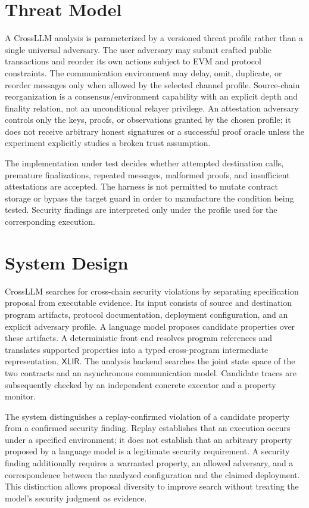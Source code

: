 \documentclass[journal]{IEEEtran}
\theoremstyle{definition}
\newcommand{\xlir}{\ensuremath{\mathsf{XLIR}}}
\begin{document}
\section{Threat Model}
\label{sec:threat}

A CrossLLM analysis is parameterized by a versioned threat profile rather than a single universal adversary. The user adversary may submit crafted public transactions and reorder its own actions subject to EVM and protocol constraints. The communication environment may delay, omit, duplicate, or reorder messages only when allowed by the selected channel profile. Source-chain reorganization is a consensus/environment capability with an explicit depth and finality relation, not an unconditional relayer privilege. An attestation adversary controls only the keys, proofs, or observations granted by the chosen profile; it does not receive arbitrary honest signatures or a successful proof oracle unless the experiment explicitly studies a broken trust assumption.

The implementation under test decides whether attempted destination calls, premature finalizations, repeated messages, malformed proofs, and insufficient attestations are accepted. The harness is not permitted to mutate contract storage or bypass the target guard in order to manufacture the condition being tested. Security findings are interpreted only under the profile used for the corresponding execution.

\section{System Design}
\label{sec:design-v2}

CrossLLM searches for cross-chain security violations by separating specification proposal from executable evidence. Its input consists of source and destination program artifacts, protocol documentation, deployment configuration, and an explicit adversary profile. A language model proposes candidate properties over these artifacts. A deterministic front end resolves program references and translates supported properties into a typed cross-program intermediate representation, $\xlir$. The analysis backend searches the joint state space of the two contracts and an asynchronous communication model. Candidate traces are subsequently checked by an independent concrete executor and a property monitor.

The system distinguishes a replay-confirmed violation of a candidate property from a confirmed security finding. Replay establishes that an execution occurs under a specified environment; it does not establish that an arbitrary property proposed by a language model is a legitimate security requirement. A security finding additionally requires a warranted property, an allowed adversary, and a correspondence between the analyzed configuration and the claimed deployment. This distinction allows proposal diversity to improve search without treating the model's security judgment as evidence.
\end{document}
